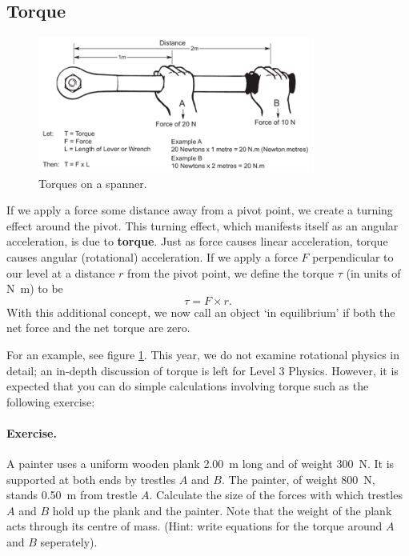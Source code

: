 \documentclass[a4paper]{amsbook}
\newcommand\capcite[1]{}
\begin{document}
\subsection{Torque}
\begin{figure}
  \centering
  \includegraphics[width=0.8\textwidth]{torque}
  \caption{Torques on a spanner. \capcite{http://www.gedore-torque.com/default/assets//Image/torque-calculation.gif}\label{fig:torque}}
\end{figure}
If we apply a force some distance away from a pivot point, we create a turning effect around the pivot. This turning
effect, which manifests itself as an angular acceleration, is due to \textbf{torque}. Just as force causes linear
acceleration, torque causes angular (rotational) acceleration. If we apply a force $ F $ perpendicular to our level
at a distance $ r $ from the pivot point, we define the torque $ \tau $ (in units of \si{\newton\metre}) to be
\begin{equation}
  \tau = F \times r.
\end{equation}
With this additional concept, we now call an object `in equilibrium' if both the net force and the net torque are zero.

For an example, see figure \ref{fig:torque}. This year, we do not examine rotational physics in detail; an in-depth
discussion of torque is left for Level 3 Physics. However, it is expected that you can do simple calculations involving
torque such as the following exercise:

\paragraph{Exercise.} A painter uses a uniform wooden plank \SI{2.00}{\metre} long and of weight \SI{300}{\newton}.
It is supported at both ends by trestles $ A $ and $ B $. The painter, of weight \SI{800}{\newton}, stands \SI{0.50}{\metre}
from trestle $ A $. Calculate the size of the forces with which trestles $ A $ and $ B $ hold up the plank and the painter.
Note that the weight of the plank acts through its centre of mass. (Hint: write equations for the torque around $ A $
and $ B $ seperately).
\end{document}
